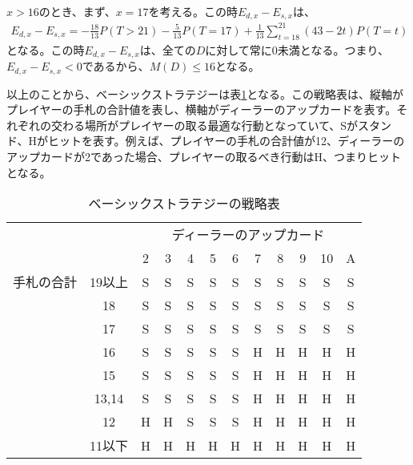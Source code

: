         \subsubsection{}
            $x>16$のとき、まず、$x=17$を考える。この時$E_{d,x}-E_{s,x}$は、
            \begin{displaymath}
                \begin{split}
                    E_{d,x}-E_{s,x}=-\frac{18}{13}P(T>21)-\frac{5}{13}P(T=17)+\frac{1}{13}\sum_{t=18}^21(43-2t)P(T=t)
                \end{split}
            \end{displaymath}
            となる。この時$E_{d,x}-E_{s,x}$は、全ての$D$に対して常に0未満となる。つまり、$E_{d,x}-E_{s,x}<0$であるから、$M(D)\leq 16$となる。
        
        以上のことから、ベーシックストラテジーは表\ref{basicstrategytable}となる。この戦略表は、縦軸がプレイヤーの手札の合計値を表し、横軸がディーラーのアップカードを表す。それぞれの交わる場所がプレイヤーの取る最適な行動となっていて、Sがスタンド、Hがヒットを表す。例えば、プレイヤーの手札の合計値が12、ディーラーのアップカードが2であった場合、プレイヤーの取るべき行動はH、つまりヒットとなる。
        \begin{table}[H]
            \begin{center}
            \label{basicstrategytable}
            \caption{ベーシックストラテジーの戦略表}
            \begin{tabular}{|lc|c|c|c|c|c|c|c|c|c|c|}
                \hline
                                            &       & \multicolumn{10}{c|}{ディーラーのアップカード}     \\ \cline{3-12} 
                                            &       & 2 & 3 & 4 & 5 & 6 & 7 & 8 & 9 & 10 & A \\ \hline
                \multicolumn{1}{|l|}{手札の合計} & 19以上  & S & S & S & S & S & S & S & S & S  & S \\ \cline{2-12} 
                \multicolumn{1}{|l|}{}      & 18    & S & S & S & S & S & S & S & S & S  & S \\ \cline{2-12} 
                \multicolumn{1}{|l|}{}      & 17    & S & S & S & S & S & S & S & S & S  & S \\ \cline{2-12} 
                \multicolumn{1}{|l|}{}      & 16    & S & S & S & S & S & H & H & H & H  & H \\ \cline{2-12} 
                \multicolumn{1}{|l|}{}      & 15    & S & S & S & S & S & H & H & H & H  & H \\ \cline{2-12} 
                \multicolumn{1}{|l|}{}      & 13,14 & S & S & S & S & S & H & H & H & H  & H \\ \cline{2-12} 
                \multicolumn{1}{|l|}{}      & 12    & H & H & S & S & S & H & H & H & H  & H \\ \cline{2-12} 
                \multicolumn{1}{|l|}{}      & 11以下  & H & H & H & H & H & H & H & H & H  & H \\ \hline
                \end{tabular}
            \end{center}
            \end{table}
    
